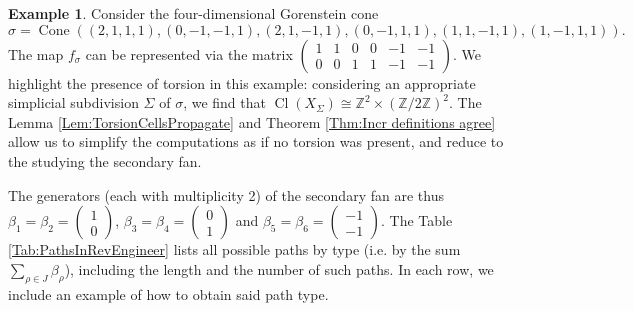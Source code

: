 \documentclass[reqno, 12pt]{amsart}
\theoremstyle{definition}
\newtheorem{example}[theorem]{Example}
\numberwithin{equation}{section}
\newcommand{\Z}{\mathbb{Z}}
\newcommand{\cone}{\operatorname{Cone}}
\begin{document}
\begin{example}
    \label{Exa:NonAlmlSimInc}
    Consider the four-dimensional Gorenstein cone \[\sigma=\cone((2,1,1,1),(0,-1,-1,1),(2,1,-1,1),(0,-1,1,1),(1,1,-1,1),(1,-1,1,1)).\]
    The map $f_{\sigma}$ can be represented via the matrix $\begin{pmatrix}
         1& 1& 0& 0 &-1 & -1\\
         0 &0 & 1& 1& -1& -1
    \end{pmatrix}.$
    We highlight the presence of torsion in this example: considering an appropriate simplicial subdivision $\Sigma$ of $\sigma$, we find that $\operatorname{Cl}(X_\Sigma)\cong\Z^2\times (\Z/2\Z)^2$. The Lemma \ref{Lem:TorsionCellsPropagate} and Theorem \ref{Thm:Incr definitions agree} allow us to simplify the computations as if no torsion was present, and reduce to the studying the secondary fan.
    
    The generators (each with multiplicity 2) of the secondary fan are thus $\beta_1=\beta_2=\begin{pmatrix}1\\ 0\end{pmatrix}$, $\beta_3=\beta_4=\begin{pmatrix}0\\ 1\end{pmatrix}$ and $\beta_5=\beta_6=\begin{pmatrix}    -1\\-1\end{pmatrix}$.
    The Table \ref{Tab:PathsInRevEngineer} lists all possible paths by type (i.e. by the sum $\sum_{\rho\in J}\beta_\rho$), including the length and the number of such paths. In each row, we include an example of how to obtain said path type.



\end{example}
\end{document}
